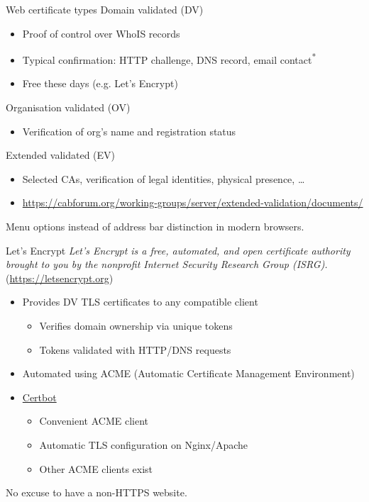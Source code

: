 \begin{frame}{Web certificate types}
  Domain validated (DV)
  \begin{itemize}[<+(1)->]
    \item Proof of control over WhoIS records
    \item Typical confirmation: HTTP challenge, DNS record, email contact\textsuperscript{*}
    \item Free these days (e.g. Let's Encrypt)
  \end{itemize}

  \pause
  Organisation validated (OV)
  \begin{itemize}[<+(1)->]
    \item Verification of org's name and registration status
  \end{itemize}

  \pause
  Extended validated (EV)
  \begin{itemize}[<+(1)->]
    \item Selected CAs, verification of legal identities, physical presence, \dots
    \item {\scriptsize\url{https://cabforum.org/working-groups/server/extended-validation/documents/}}
  \end{itemize}

  \pause
  Menu options instead of address bar distinction in modern browsers.
\end{frame}

\begin{frame}{Let's Encrypt}
  \pause
  \textit{Let's Encrypt is a free, automated, and open certificate authority brought to you by the nonprofit Internet Security Research Group (ISRG).} ({\scriptsize\url{https://letsencrypt.org}})
  \begin{itemize}[<+(1)->]
    \item Provides DV TLS certificates to any compatible client
    \begin{itemize}
      \item Verifies domain ownership via unique tokens
      \item Tokens validated with HTTP/DNS requests
    \end{itemize}
    \item Automated using ACME (Automatic Certificate Management Environment)
    \item \href{https://certbot.eff.org}{Certbot}
    \begin{itemize}
      \item Convenient ACME client
      \item Automatic TLS configuration on Nginx/Apache
      \item Other ACME clients exist
    \end{itemize}
  \end{itemize}

  \pause
  No excuse to have a non-HTTPS website.
\end{frame}

